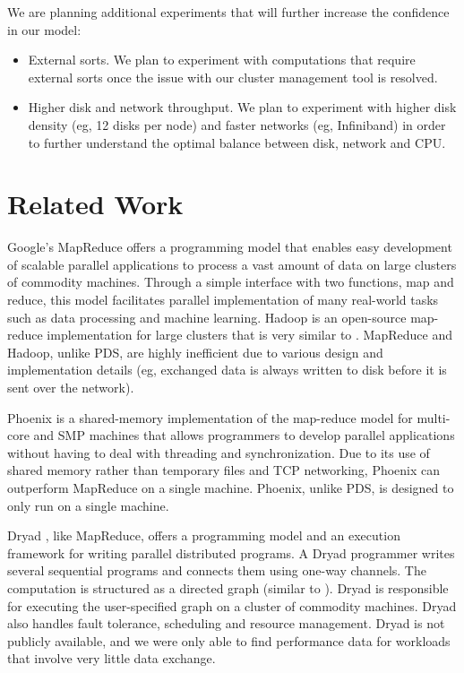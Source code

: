 \documentclass[ 11pt, letterpaper]{article}%
\begin{document}
We are planning additional experiments that will further increase the
confidence in our model:
\begin{itemize}
  \item External sorts. We plan to experiment with computations that require
  external sorts once the issue with our cluster management tool is resolved.
  \item Higher disk and network throughput. We plan to experiment with higher
  disk density (eg, 12 disks per node) and faster networks (eg, Infiniband) in
  order to further understand the optimal balance between disk, network and CPU.
\end{itemize}

\section{Related Work}
Google's MapReduce \cite{mapreduce} offers a programming model that enables
easy development of scalable parallel applications to process a vast amount of
data on large clusters of commodity machines. Through a simple interface with
two functions, map and reduce, this model facilitates parallel implementation
of many real-world tasks such as data processing and machine learning. Hadoop
\cite{hadoop} is an open-source map-reduce implementation for large clusters
that is very similar to \cite{mapreduce}. MapReduce and Hadoop, unlike PDS, are
highly inefficient due to various design and implementation details (eg,
exchanged data is always written to disk before it is sent over the network).

Phoenix \cite{phoenix} is a shared-memory implementation of the map-reduce
model for multi-core and SMP machines that allows programmers to develop
parallel applications without having to deal with threading and
synchronization. Due to its use of shared memory rather than temporary files
and TCP networking, Phoenix can  outperform MapReduce on a single machine.
Phoenix, unlike PDS, is designed to only run on a single machine.

Dryad \cite{dryad}, like MapReduce, offers a programming model and an execution
framework for writing parallel distributed programs. A Dryad programmer writes
several sequential programs and connects them using one-way channels. The
computation is structured as a directed graph (similar to
\cite{paralleldatabases}). Dryad is responsible for executing the
user-specified graph on a cluster of commodity machines. Dryad also handles
fault tolerance, scheduling and resource management. Dryad is not publicly
available, and we were only able to find performance data for workloads that
involve very little data exchange.
\end{document}
